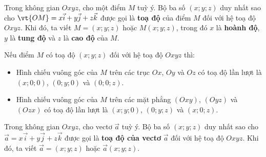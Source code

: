 \begin{dinhnghia}
\begin{minipage}[c]{.6\linewidth}
Trong không gian $Oxyz$, cho một điểm $M$ tuỳ ý. Bộ ba số $(x;y;z)$ duy nhất sao cho $\vt{OM}=x\vec i+y\vec j+z\vec k$ được gọi là \textbf{toạ độ} của điểm $M$ đối với hệ toạ độ $Oxyz$. Khi đó, ta viết $M=(x;y;z)$ hoặc $M(x;y;z)$, trong đó $x$ là \textbf{hoành độ}, $y$ là \textbf{tung độ} và $z$ là \textbf{cao độ} của $M$.
\end{minipage}\hfill
\begin{minipage}[c]{.37\linewidth}\centering
{}
\end{minipage}
\end{dinhnghia}

\begin{nhanxet}
Nếu điểm $M$ có toạ độ $(x;y;z)$ đối với hệ toạ độ $Oxyz$ thì:
\begin{itemize}
  \item Hình chiếu vuông góc của $M$ trên các trục $Ox$, $Oy$ và $Oz$ có toạ độ lần lượt là $(x;0;0)$, $(0;y;0)$ và $(0;0;z)$.
  \item Hình chiếu vuông góc của $M$ trên các mặt phẳng $(Oxy)$, $(Oyz)$ và $(Ozx)$ có toạ độ lần lượt là $(x;y;0)$, $(0;y;z)$ và $(x;0;z)$.
\end{itemize}
\end{nhanxet}

\begin{dinhnghia}
Trong không gian $Oxyz$, cho vectơ $\vec a$ tuỳ ý. Bộ ba số $(x;y;z)$ duy nhất sao cho $\vec a=x\vec i+y\vec j+z\vec k$ được gọi là \textbf{toạ độ của vectơ} $\vec a$ đối với hệ toạ độ $Oxyz$. Khi đó, ta viết $\vec a=(x;y;z)$ hoặc $\vec a(x;y;z)$.
\end{dinhnghia}


